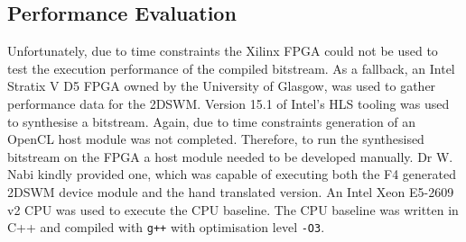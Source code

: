 \documentclass{mpaper}
\begin{document}
% 

\subsection{Performance Evaluation}
\label{perf_eval}

Unfortunately, due to time constraints the Xilinx FPGA could not be used to test the execution performance of the compiled bitstream.
As a fallback, an Intel Stratix V D5 FPGA owned by the University of Glasgow, was used to gather performance data for the 2DSWM.
Version 15.1 of Intel's HLS tooling was used to synthesise a bitstream.
Again, due to time constraints generation of an OpenCL host module was not completed.  
Therefore, to run the synthesised bitstream on the FPGA a host module needed to be developed manually.
Dr W. Nabi kindly provided one, which was capable of executing both the F4 generated 2DSWM device module and the hand translated version.  
An Intel Xeon E5-2609 v2 CPU was used to execute the CPU baseline.
The CPU baseline was written in C++ and compiled with \texttt{g++} with optimisation level \texttt{-O3}.
\end{document}
